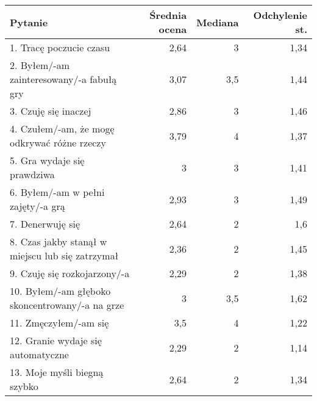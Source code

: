 \begin{table}[h!]
    \begin{center}
        \begin{tabular}{|m{10em}|r|r|r|}
            \hline
            Pytanie                                                           & Średnia ocena & Mediana & Odchylenie st. \\
            \hline
            1. Tracę poczucie czasu                                           & 2,64          & 3       & 1,34           \\
            2. Byłem/-am \newline zainteresowany/-a fabułą gry                & 3,07          & 3,5     & 1,44           \\
            3. Czuję się inaczej                                              & 2,86          & 3       & 1,46           \\
            4. Czułem/-am, że mogę odkrywać różne rzeczy                      & 3,79          & 4       & 1,37           \\
            5. Gra wydaje się prawdziwa                                       & 3             & 3       & 1,41           \\
            6. Byłem/-am \newline w pełni zajęty/-a grą                       & 2,93          & 3       & 1,49           \\
            7. Denerwuję się                                                  & 2,64          & 2       & 1,6            \\
            8. Czas jakby stanął w miejscu lub się zatrzymał                  & 2,36          & 2       & 1,45           \\
            9. Czuję się \newline rozkojarzony/-a                             & 2,29          & 2       & 1,38           \\
            10. Byłem/-am głęboko \newline skoncentrowany/-a \newline na grze & 3             & 3,5     & 1,62           \\
            11. Zmęczyłem/-am się                                             & 3,5           & 4       & 1,22           \\
            12. Granie wydaje się automatyczne                                & 2,29          & 2       & 1,14           \\
            13. Moje myśli \newline biegną szybko                             & 2,64          & 2       & 1,34           \\

\end{tabular}
\end{center}
\end{table}

